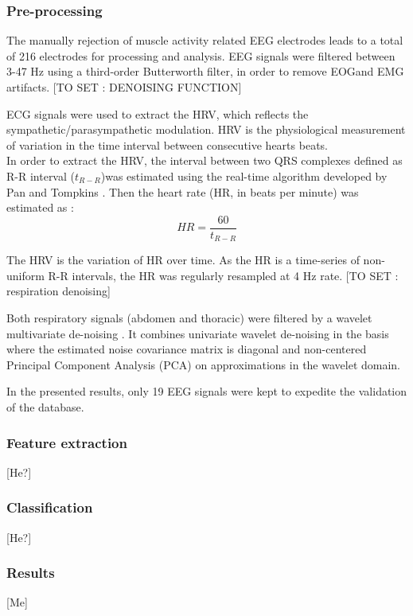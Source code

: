 \subsubsection{Pre-processing}
The manually rejection of muscle activity related \ac{EEG} electrodes leads to a total of 216 electrodes for processing and analysis. \ac{EEG} signals were filtered between 3-47 Hz using a third-order Butterworth filter, in order to remove \ac{EOG}and \ac{EMG} artifacts.
[TO SET : DENOISING FUNCTION]

\ac{ECG} signals were used to extract the \ac{HRV}, which reflects the sympathetic/parasympathetic modulation. \ac{HRV} is the physiological measurement of variation in the time interval between consecutive hearts beats.\\
In order to extract the \ac{HRV}, the interval between two QRS complexes defined as R-R interval ($t_{R-R}$)was estimated using the real-time algorithm developed by Pan and Tompkins \cite{HR}. Then the heart rate (HR, in beats per minute) was estimated as :
\begin{equation}
	HR = \frac{60}{t_{R-R}}
\end{equation}

The \ac{HRV} is the variation of HR over time. As the HR is a time-series of non-uniform R-R intervals, the HR was regularly resampled at 4 Hz rate.
[TO SET : respiration denoising]

Both respiratory signals (abdomen and thoracic) were filtered by a wavelet multivariate de-noising
\cite{waveletDenoise}.
It combines univariate wavelet de-noising in the basis where the estimated noise covariance matrix is diagonal and non-centered Principal Component Analysis (PCA) on approximations in the wavelet domain.

In the presented results, only 19 \ac{EEG} signals were kept to expedite the validation of the database.


\subsubsection{Feature extraction}
[He?]
\subsubsection{Classification}
[He?]

\subsubsection{Results}
[Me]


